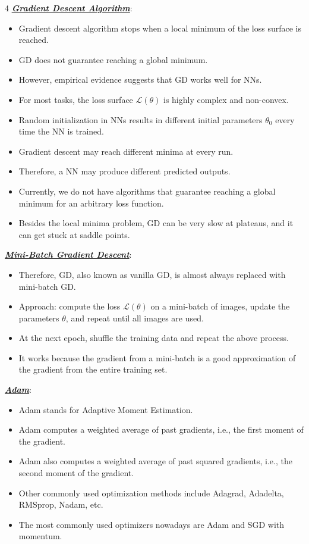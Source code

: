 \documentclass[12pt]{article}
\newcommand{\bulletPoint}[1]{\ul{\textit{\textbf{#1}}}}
\begin{document}
\begin{multicols*}{4}
\bulletPoint{Gradient Descent Algorithm}:
\begin{itemize}
\item Gradient descent algorithm stops when a local minimum of the loss surface is reached.
\item GD does not guarantee reaching a global minimum.
\item However, empirical evidence suggests that GD works well for NNs.
\item For most tasks, the loss surface $\mathcal{L}(\theta)$ is highly complex and non-convex.
\item Random initialization in NNs results in different initial parameters $\theta_0$ every time the NN is trained.
\item Gradient descent may reach different minima at every run.
\item Therefore, a NN may produce different predicted outputs.
\item Currently, we do not have algorithms that guarantee reaching a global minimum for an arbitrary loss function.
\item Besides the local minima problem, GD can be very slow at plateaus, and it can get stuck at saddle points.
\end{itemize}

\bulletPoint{Mini-Batch Gradient Descent}:
\begin{itemize}
\item Therefore, GD, also known as vanilla GD, is almost always replaced with mini-batch GD.
\item Approach: compute the loss $\mathcal{L}(\theta)$ on a mini-batch of images, update the parameters $\theta$, and repeat until all images are used.
\item At the next epoch, shuffle the training data and repeat the above process.
\item It works because the gradient from a mini-batch is a good approximation of the gradient from the entire training set.
\end{itemize}

\bulletPoint{Adam}:
\begin{itemize}
\item Adam stands for Adaptive Moment Estimation.
\item Adam computes a weighted average of past gradients, i.e., the first moment of the gradient.
\item Adam also computes a weighted average of past squared gradients, i.e., the second moment of the gradient.
\item Other commonly used optimization methods include Adagrad, Adadelta, RMSprop, Nadam, etc.
\item The most commonly used optimizers nowadays are Adam and SGD with momentum.
\end{itemize}


\end{multicols*}
\end{document}
